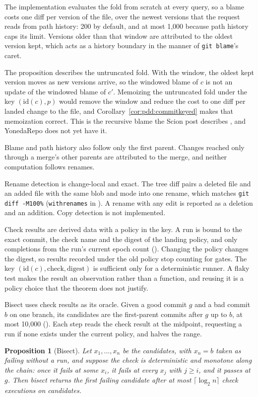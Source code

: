 \documentclass[11pt,letterpaper]{article}
\newtheorem{proposition}[theorem]{Proposition}
\theoremstyle{definition}
\theoremstyle{remark}
\newcommand{\id}{\mathrm{id}}
\DeclareRobustCommand{\code}[1]{{\def\_{\textunderscore\allowbreak}\texttt{#1}}}
\begin{document}
The implementation evaluates the fold from scratch at every query, so a blame costs one diff per version of the file, over the newest versions that the request reads from path history: 200 by default, and at most 1,000 because path history caps its limit. Versions older than that window are attributed to the oldest version kept, which acts as a history boundary in the manner of \code{git blame}'s caret.

The proposition describes the untruncated fold. With the window, the oldest kept version moves as new versions arrive, so the windowed blame of $c$ is not an update of the windowed blame of $c'$. Memoizing the untruncated fold under the key $(\id(c),p)$ would remove the window and reduce the cost to one diff per landed change to the file, and Corollary~\ref{cor:pdd:commitkeyed} makes that memoization correct. This is the recursive blame the Scion post describes \cite{anthropic2026scion}, and YonedaRepo does not yet have it.

Blame and path history also follow only the first parent. Changes reached only through a merge's other parents are attributed to the merge, and neither computation follows renames.

Rename detection is change-local and exact. The tree diff pairs a deleted file and an added file with the same blob and mode into one rename, which matches \code{git diff -M100\%} (\code{with\_renames} in ). A rename with any edit is reported as a deletion and an addition. Copy detection is not implemented.

Check results are derived data with a policy in the key. A run is bound to the exact commit, the check name and the digest of the landing policy, and only completions from the run's current epoch count (). Changing the policy changes the digest, so results recorded under the old policy stop counting for gates. The key $(\id(c),\text{check},\text{digest})$ is sufficient only for a deterministic runner. A flaky test makes the result an observation rather than a function, and reusing it is a policy choice that the theorem does not justify.

Bisect uses check results as its oracle. Given a good commit $g$ and a bad commit $b$ on one branch, its candidates are the first-parent commits after $g$ up to $b$, at most 10,000 (). Each step reads the check result at the midpoint, requesting a run if none exists under the current policy, and halves the range.

\begin{proposition}[Bisect]
\label{prop:pdd:bisect}
Let $x_1,\ldots,x_n$ be the candidates, with $x_n=b$ taken as failing without a run, and suppose the check is deterministic and monotone along the chain: once it fails at some $x_i$, it fails at every $x_j$ with $j\ge i$, and it passes at $g$. Then bisect returns the first failing candidate after at most $\lceil\log_2 n\rceil$ check executions on candidates.
\end{proposition}
\end{document}
